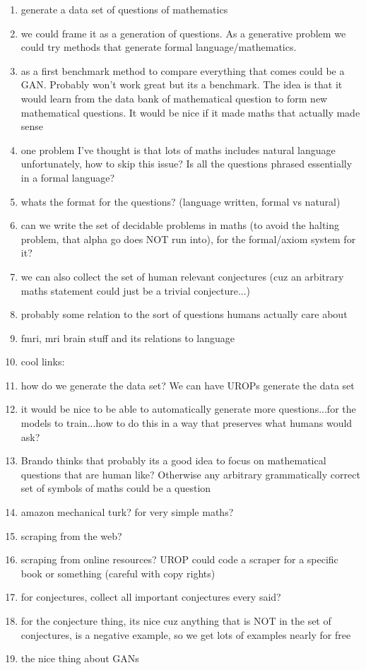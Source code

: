 \documentclass[11pt]{article}
\begin{document}
\begin{enumerate}
\item generate a data set of questions of mathematics
\item we could frame it as a generation of questions. As a generative problem we could try methods that generate formal language/mathematics.
\item as a first benchmark method to compare everything that comes could be a GAN. Probably won't work great but its a benchmark. The idea is that it would learn from the data bank of mathematical question to form new mathematical questions. It would be nice if it made maths that actually made sense
\item one problem I've thought is that lots of maths includes natural language unfortunately, how to skip this issue? Is all the questions phrased essentially in a formal language?
\item whats the format for the questions? (language written, formal vs natural)
\item can we write the set of decidable problems in maths (to avoid the halting problem, that alpha go does NOT run into), for the formal/axiom system for it?
\item we can also collect the set of human relevant conjectures (cuz an arbitrary maths statement could just be a trivial conjecture...)
\item probably some relation to the sort of questions humans actually care about
\item fmri, mri brain stuff and its relations to language
\item cool links: %
\item how do we generate the data set? We can have UROPs generate the data set
\item it would be nice to be able to automatically generate more questions...for the models to train...how to do this in a way that preserves what humans would ask?
\item Brando thinks that probably its a good idea to focus on mathematical questions that are human like? Otherwise any arbitrary grammatically correct set of symbols of maths could be a question
\item amazon mechanical turk? for very simple maths?
\item scraping from the web?
\item scraping from online resources? UROP could code a scraper for a specific book or something (careful with copy rights)
\item for conjectures, collect all important conjectures every said?
\item for the conjecture thing, its nice cuz anything that is NOT in the set of conjectures, is a negative example, so we get lots of examples nearly for free
\item the nice thing about GANs
\end{enumerate}
\end{document}

